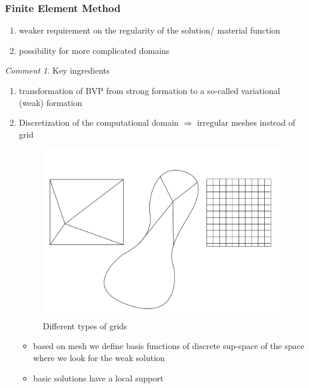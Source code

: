 \documentclass[english]{article}
\theoremstyle{definition}
\theoremstyle{remark}
\newtheorem*{comm}{Comment}
\newcommand{\drw}{\Rightarrow}			%
\begin{document}
\subsubsection{Finite Element Method}
\begin{enumerate}
\item weaker requirement on the regularity of the solution/ material function
\item possibility for more complicated domains
\end{enumerate}
\begin{comm}
  Key ingredients
  \begin{enumerate}
  \item transformation of BVP from strong formation to a so-called variational  (weak) formation
  \item Discretization of the computational domain $\drw$ irregular meshes instead of grid

    \begin{figure}[tbh]
      \begin{center}
        \includegraphics[width=\textwidth]{figs/differentGrids.pdf}
      \end{center}
      \caption{Different types of grids}
      \label{different-grids-figure}
    \end{figure}

    \begin{itemize}
    \item based on mesh we define basis functions of discrete sup-space of the space where we look for the weak solution
    \item basic solutions have a local support
    \end{itemize}
  \end{enumerate}
\end{comm}
\end{document}
